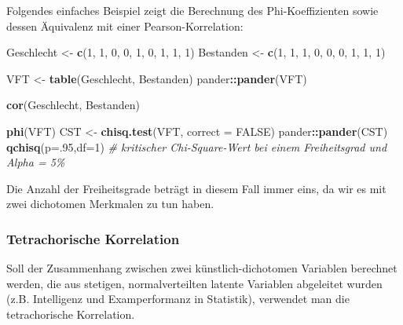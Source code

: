 \documentclass[
]{article}
\newenvironment{Shaded}{\begin{snugshade}}{\end{snugshade}}
\newcommand{\AttributeTok}[1]{\textcolor[rgb]{0.13,0.29,0.53}{#1}}
\newcommand{\CommentTok}[1]{\textcolor[rgb]{0.56,0.35,0.01}{\textit{#1}}}
\newcommand{\ConstantTok}[1]{\textcolor[rgb]{0.56,0.35,0.01}{#1}}
\newcommand{\DecValTok}[1]{\textcolor[rgb]{0.00,0.00,0.81}{#1}}
\newcommand{\FunctionTok}[1]{\textcolor[rgb]{0.13,0.29,0.53}{\textbf{#1}}}
\newcommand{\NormalTok}[1]{#1}
\newcommand{\OtherTok}[1]{\textcolor[rgb]{0.56,0.35,0.01}{#1}}
\newcommand{\SpecialCharTok}[1]{\textcolor[rgb]{0.81,0.36,0.00}{\textbf{#1}}}
\begin{document}
Folgendes einfaches Beispiel zeigt die Berechnung des Phi-Koeffizienten sowie dessen Äquivalenz mit einer Pearson-Korrelation:

\begin{Shaded}
\begin{Highlighting}[]
\NormalTok{      Geschlecht }\OtherTok{\textless{}{-}} \FunctionTok{c}\NormalTok{(}\DecValTok{1}\NormalTok{,  }\DecValTok{1}\NormalTok{,  }\DecValTok{0}\NormalTok{,  }\DecValTok{0}\NormalTok{,  }\DecValTok{1}\NormalTok{,  }\DecValTok{0}\NormalTok{,  }\DecValTok{1}\NormalTok{,  }\DecValTok{1}\NormalTok{,  }\DecValTok{1}\NormalTok{)}
\NormalTok{      Bestanden  }\OtherTok{\textless{}{-}} \FunctionTok{c}\NormalTok{(}\DecValTok{1}\NormalTok{,  }\DecValTok{1}\NormalTok{,  }\DecValTok{1}\NormalTok{,  }\DecValTok{0}\NormalTok{,  }\DecValTok{0}\NormalTok{,  }\DecValTok{0}\NormalTok{,  }\DecValTok{1}\NormalTok{,  }\DecValTok{1}\NormalTok{,  }\DecValTok{1}\NormalTok{)}
      
\NormalTok{      VFT        }\OtherTok{\textless{}{-}} \FunctionTok{table}\NormalTok{(Geschlecht, Bestanden)}
\NormalTok{      pander}\SpecialCharTok{::}\FunctionTok{pander}\NormalTok{(VFT)}
      
      \FunctionTok{cor}\NormalTok{(Geschlecht, Bestanden)}
      
      \FunctionTok{phi}\NormalTok{(VFT)}
\NormalTok{      CST }\OtherTok{\textless{}{-}} \FunctionTok{chisq.test}\NormalTok{(VFT, }\AttributeTok{correct =} \ConstantTok{FALSE}\NormalTok{)}
\NormalTok{      pander}\SpecialCharTok{::}\FunctionTok{pander}\NormalTok{(CST)}
      \FunctionTok{qchisq}\NormalTok{(}\AttributeTok{p=}\NormalTok{.}\DecValTok{95}\NormalTok{,}\AttributeTok{df=}\DecValTok{1}\NormalTok{) }\CommentTok{\# kritischer Chi{-}Square{-}Wert bei einem Freiheitsgrad und Alpha = 5\%}
\end{Highlighting}
\end{Shaded}

Die Anzahl der Freiheitsgrade beträgt in diesem Fall immer eins, da wir es mit zwei dichotomen Merkmalen zu tun haben.

\subsubsection*{Tetrachorische Korrelation}\label{tetrachorische-korrelation}

Soll der Zusammenhang zwischen zwei künstlich-dichotomen Variablen berechnet werden, die aus stetigen, normalverteilten latente Variablen abgeleitet wurden (z.B. Intelligenz und Examperformanz in Statistik), verwendet man die tetrachorische Korrelation.
\end{document}
